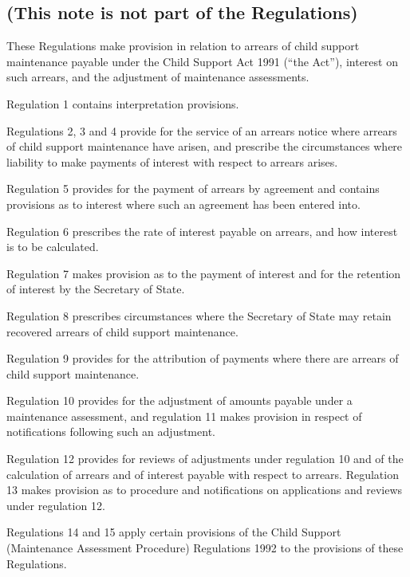 \documentclass[a4paper]{article}
\newcommand{\parthead}{}
\begin{document}
\renewcommand\parthead{--- Explanatory Note}

\subsection*{(This note is not part of the Regulations)}

 These Regulations make provision in relation to arrears of child support maintenance payable under the Child Support Act 1991 (“the Act”), interest on such arrears, and the adjustment of maintenance assessments.

  Regulation 1 contains interpretation provisions.

  Regulations 2, 3 and 4 provide for the service of an arrears notice where arrears of child support maintenance have arisen, and prescribe the circumstances where liability to make payments of interest with respect to arrears arises.

  Regulation 5 provides for the payment of arrears by agreement and contains provisions as to interest where such an agreement has been entered into.

  Regulation 6 prescribes the rate of interest payable on arrears, and how interest is to be calculated.

  Regulation 7 makes provision as to the payment of interest and for the retention of interest by the Secretary of State.

  Regulation 8 prescribes circumstances where the Secretary of State may retain recovered arrears of child support maintenance.

  Regulation 9 provides for the attribution of payments where there are arrears of child support maintenance.

  Regulation 10 provides for the adjustment of amounts payable under a maintenance assessment, and regulation 11 makes provision in respect of notifications following such an adjustment.

  Regulation 12 provides for reviews of adjustments under regulation 10 and of the calculation of arrears and of interest payable with respect to arrears. Regulation 13 makes provision as to procedure and notifications on applications and reviews under regulation 12.

  Regulations 14 and 15 apply certain provisions of the Child Support (Maintenance Assessment Procedure) Regulations 1992 to the provisions of these Regulations.
\end{document}
